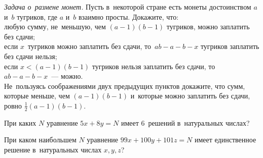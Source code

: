 


\begin{problems}

\item\emph{Задача о~размене монет.}
Пусть в~некоторой стране есть монеты достоинством $a$ и~$b$ тугриков, где $a$
и~$b$ взаимно просты.
Докажите, что:
\\
\subproblem
любую сумму, не~меньшую, чем $(a - 1) (b - 1)$ тугриков, можно заплатить без
сдачи;
\\
\subproblem
если $x$~тугриков можно заплатить без сдачи, то~$a b - a - b - x$ тугриков
заплатить без сдачи нельзя;
\\
\subproblem
если $x < (a - 1) (b - 1)$ тугриков нельзя заплатить без сдачи,
то~$ab - a - b - x$~--- можно.
\\
\subproblem
Не~пользуясь соображениями двух предыдущих пунктов докажите, что сумм, которые
меньше, чем $(a - 1) (b - 1)$ и~которые можно заплатить без сдачи,
ровно $\frac{1}{2} (a - 1) (b - 1)$. 

\item
При каких $N$ уравнение $5 x + 8 y = N$ имеет $6$~решений в~натуральных числах? 

\item
При каком наибольшем $N$ уравнение $99 x + 100 y + 101 z = N$ имеет
единственное решение в~натуральных числах $x, y, z$?


\end{problems}

